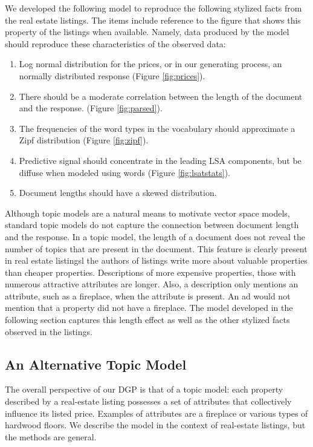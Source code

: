 \documentclass[12pt]{article}
\begin{document}
We developed the following model to reproduce the following stylized facts from the real estate listings.  The items include reference to the figure that shows this property of the listings when available.    Namely, data produced by the model should reproduce these characteristics of the observed data:
\begin{enumerate}
 \item Log normal distribution for the prices, or in our generating process, an normally distributed response (Figure \ref{fig:prices}).
  \item There should be a moderate correlation between the length of the document and the response.
  (Figure \ref{fig:parsed}).
 \item The frequencies of the word types in the vocabulary should approximate a Zipf distribution (Figure \ref{fig:zipf}).
  \item Predictive signal should concentrate in the leading LSA components, but be diffuse when modeled using words (Figure \ref{fig:lsatstats}).
  \item Document lengths should have a skewed distribution.
\end{enumerate}

Although topic models are a natural means to motivate vector space models, standard topic models do not capture the connection between document length and the response.  In a topic model, the length of a document does not reveal the number of topics that are present in the document.  This feature is clearly present in real estate listingsl the authors of listings write more about valuable properties than cheaper properties.  Descriptions of more expensive properties, those with numerous attractive attributes are longer.  Also, a description only mentions an attribute, such as a fireplace, when the attribute is present.   An ad would not mention that a property did not have a fireplace.  The  model developed in the following section captures this length effect as well as the other stylized facts observed in the listings.


\subsection{ An Alternative Topic Model } %

The overall perspective of our DGP is that of a topic model: each property described by a real-estate listing possesses a set of attributes that collectively influence its listed price.   Examples of attributes are a fireplace or various types of hardwood floors.  We describe the model in the context of real-estate listings, but the methods are general.
 
\end{document}
